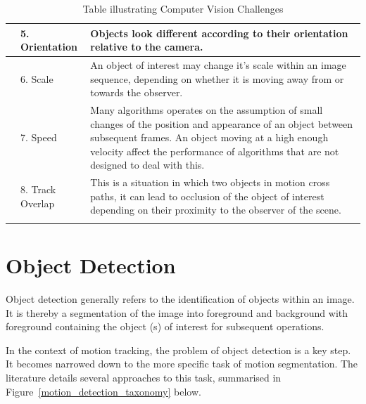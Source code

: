 \begin{longtable}{c  p{3cm}  p{4cm}}
    &
    5. Orientation
    &
    Objects look different according to their orientation relative
    to the camera.
    \\ \bottomrule

    &
    6. Scale
    &
    An object of interest may change it's scale within an image
    sequence, depending on whether it is moving away from or towards
    the observer.
    \\ \bottomrule

    &
    7. Speed 
    &
    Many algorithms operates on the assumption of small
    changes of the position and appearance of an object between
    subsequent frames. An object moving at a high enough velocity
    affect the performance of algorithms that are not designed to
    deal with this.
    \\ \bottomrule
    &
    8. Track Overlap
    &
    This is a situation in which two objects in motion cross paths, it can lead
    to occlusion of the object of interest depending on their proximity to the
    observer of the scene.
    \\ \bottomrule

    \caption{Table illustrating Computer Vision Challenges}
\end{longtable}\label{tbl:computer_vision_challenges}

\section{Object Detection}
Object detection generally refers to the identification of objects within
an image. It is thereby a segmentation of the image into foreground
and background with foreground containing the object (s) of interest for subsequent
operations.

In the context of motion tracking, the problem of object detection is a key
step. It becomes narrowed down to the more specific task of motion segmentation.
The literature details several approaches to this task, summarised in 
Figure~\ref{motion_detection_taxonomy} below.


